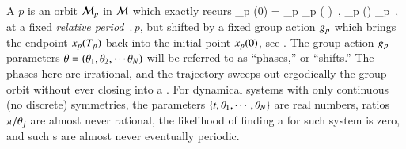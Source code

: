 A {\em \rpo} $p$ is an orbit ${\cal M}_p$ in {\statesp} ${\cal M}$
which exactly recurs
\beq
\ssp_p (0) = \LieEl_p \ssp_p ( )
    \,,\qquad
\ssp_p (\tau) \in \pS_p
    \,,
\label{RPOrelper1}
\eeq
at a fixed {\em relative period} $\period{p}$, but
shifted by a fixed group action ${g_p}$
which brings the endpoint $x_p ({T_{p}} ) $
back into the initial point $x_p (0) $, see .
The group action ${g_p}$ parameters
${\bf \theta} = ({\bf \theta}_1,{\bf \theta}_2,\cdots{\bf \theta}_N)$
will be referred to as ``phases,'' or ``shifts.''
The phases here are irrational, and the trajectory sweeps out
ergodically the group orbit without ever closing into a \po.
For dynamical systems with only continuous (no discrete)
symmetries, the parameters $\{t,{\bf \theta}_1,\cdots,{\bf \theta}_N\}$
are real numbers, ratios $\pi/{\bf \theta}_j$ are almost never
rational, the likelihood of finding a {\po} for such system is
{zero}, and such \rpo s are almost never eventually periodic.


